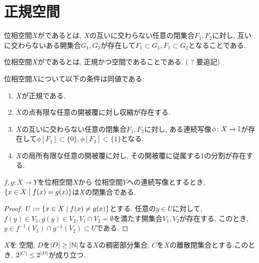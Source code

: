 \documentclass[uplatex, dvipdfmx, a4paper, 12pt, class=jsbook, crop=false]{standalone}
\begin{document}
\section{正規空間}
\label{sec:normal-spaces}

\begin{definition}
	位相空間$ X $がであるとは, $ X $の互いに交わらない任意の閉集合$ F_1, F_2 $に対し, 互いに交わらないある開集合$ G_1, G_2 $が存在して$ F_1 \subset G_1, F_1 \subset G_2 $となることである.
\end{definition}

\begin{definition}
	位相空間$ X $がであるとは, 正規かつ空間であることである. ( ? 要追記)
\end{definition}

\begin{theorem}
	位相空間$ X $について以下の条件は同値である:
	\begin{enumerate}
		\item $ X $が正規である.
		\item $ X $の点有限な任意の開被覆に対し収縮が存在する.
		\item  $ X $の互いに交わらない任意の閉集合$ F_1, F_2 $に対し, ある連続写像$ \phi \colon X \rightarrow \mathbb{I} $が存在して$ \phi[F_1] \subset \{0\}, \phi[F_2] \subset \{1\} $となる.
		\item $ X $の局所有限な任意の開被覆に対し, その開被覆に従属する1の分割が存在する.
	\end{enumerate}
\end{theorem}

\begin{lemma}
	\label{lem:Let X and Y are top.sp, Y is T2, f,g : X to Y are conti, then the set defined as {x in X | f(x) = g(x)} is closed.}
	$f, g \colon X \to Y $を位相空間$ X $から  位相空間$ Y $への連続写像とするとき, $ \setcomp{x \in X}{f(x) = g(x)} $は$ X $の閉集合である.
\end{lemma}

\begin{proof}
	$ U \defeq \setcomp{x \in X}{f(x) \neq g(x)} $とする. 任意の$ y \in U $に対して, $ f(y) \in V_1, g(y) \in V_2, V_1 \cap V_2 = \emptyset $を満たす開集合$ V_1, V_2 $が存在する. このとき, $ y \in f^{-1}(V_1) \cap g^{-1}(V_2) \subset U $である.
\end{proof}

\begin{theorem}
	\label{thm:Jone's Lemma}
	$ X $を  空間, $ D $を$ \left|D\right| \geq \left|\mathbb{N}\right| $なる$ X $の稠密部分集合, $ C $を$ X $の離散閉集合とする.このとき, $2^{\left|C\right|} \leq 2^{\left|D\right|} $が成り立つ.
\end{theorem}
\end{document}
